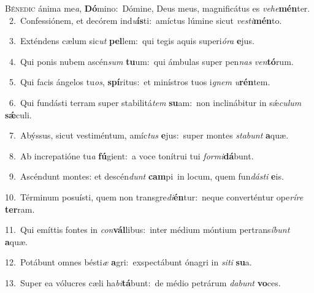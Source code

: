 \lettrine{\initial\textcolor{\initialcolor}{B}}{énedic} ánima me\-\textit{a}\-, \textbf{Dó}\-mino:~\star Dómine, Deus meus, magnificátus es \textit{ve}\-\textit{he}\textbf{mén}ter.\\
{\numbfont\textcolor{\numbcolor}{~2.}}~Confessiónem, et decórem ind\-\textit{u}\-\textbf{ís}ti:~\star amíctus lúmine sicut \textit{ves}\-\textit{ti}\textbf{mén}to.\par
{\numbfont\textcolor{\numbcolor}{~3.}}~Exténdens cælum sic\textit{ut} \textbf{pel}\-lem:~\star qui tegis aquis superi\-\textit{ó}\-\textit{ra} \textbf{e}\-jus.\par
{\numbfont\textcolor{\numbcolor}{~4.}}~Qui ponis nubem ascén\textit{sum} \textbf{tu}\-um:~\star qui ámbulas super pen\textit{nas} \textit{ven}\-\textbf{tó}rum.\par
{\numbfont\textcolor{\numbcolor}{~5.}}~Qui facis ángelos tu\-\textit{os}\-, \textbf{spí}\-ritus:~\star et minístros tuos i\textit{gnem} \textit{u}\-\textbf{rén}tem.\par
{\numbfont\textcolor{\numbcolor}{~6.}}~Qui fundásti terram super stabilitá\textit{tem} \textbf{su}\-am:~\star non inclinábitur in sǽ\-\textit{cu}\-\textit{lum} \textbf{sǽ}\-culi.\par
{\numbfont\textcolor{\numbcolor}{~7.}}~Abýssus, sicut vestiméntum, amíc\textit{tus} \textbf{e}\-jus:~\star super montes \textit{sta}\-\textit{bunt} \textbf{a}\-quæ.\par
{\numbfont\textcolor{\numbcolor}{~8.}}~Ab increpatióne tu\textit{a} \textbf{fú}\-gient:~\star a voce tonítrui tui \textit{for}\-\textit{mi}\textbf{dá}bunt.\par
{\numbfont\textcolor{\numbcolor}{~9.}}~Ascéndunt montes: et descén\textit{dunt} \textbf{cam}\-pi~\star in locum, quem fun\-\textit{dás}\-\textit{ti} \textbf{e}\-is.\par
{\numbfont\textcolor{\numbcolor}{10.}}~Términum posuísti, quem non transgre\-\textit{di}\-\textbf{én}tur:~\star neque converténtur ope\-\textit{rí}\-\textit{re} \textbf{ter}\-ram.\par
{\numbfont\textcolor{\numbcolor}{11.}}~Qui emíttis fontes in \textit{con}\-\textbf{vál}libus:~\star inter médium móntium pertrans\-\textit{í}\-\textit{bunt} \textbf{a}\-quæ.\par
{\numbfont\textcolor{\numbcolor}{12.}}~Potábunt omnes bésti\textit{æ} \textbf{a}\-gri:~\star exspectábunt ónagri in \textit{si}\-\textit{ti} \textbf{su}\-a.\par
{\numbfont\textcolor{\numbcolor}{13.}}~Super ea vólucres cæli ha\-\textit{bi}\-\textbf{tá}bunt:~\star de médio petrárum \textit{da}\-\textit{bunt} \textbf{vo}\-ces.\par
